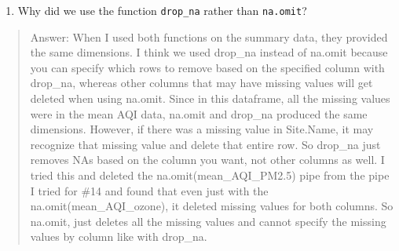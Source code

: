\documentclass[
]{article}
\providecommand{\tightlist}{%
  \setlength{\itemsep}{0pt}\setlength{\parskip}{0pt}}
\begin{document}
\begin{enumerate}
\def\labelenumi{\arabic{enumi}.}
\setcounter{enumi}{13}
\tightlist
\item
  Why did we use the function \texttt{drop\_na} rather than
  \texttt{na.omit}?
\end{enumerate}

\begin{quote}
Answer: When I used both functions on the summary data, they provided
the same dimensions. I think we used drop\_na instead of na.omit because
you can specify which rows to remove based on the specified column with
drop\_na, whereas other columns that may have missing values will get
deleted when using na.omit. Since in this dataframe, all the missing
values were in the mean AQI data, na.omit and drop\_na produced the same
dimensions. However, if there was a missing value in Site.Name, it may
recognize that missing value and delete that entire row. So drop\_na
just removes NAs based on the column you want, not other columns as
well. I tried this and deleted the na.omit(mean\_AQI\_PM2.5) pipe from
the pipe I tried for \#14 and found that even just with the
na.omit(mean\_AQI\_ozone), it deleted missing values for both columns.
So na.omit, just deletes all the missing values and cannot specify the
missing values by column like with drop\_na.
\end{quote}
\end{document}
